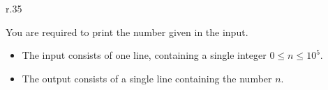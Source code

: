 
\begin{wrapfigure}{r}{.35\textwidth}
	\vspace*{-3mm} %
	\centering
	\vspace*{-10mm} %
\end{wrapfigure}

\newcommand{\maxn}{10^5}

You are required to print the number given in the input.

\begin{Input}
	\begin{itemize}
		\item The input consists of one line, containing a single integer $0\leq n\leq \maxn$.
	\end{itemize}
\end{Input}

\begin{Output}
	\begin{itemize}
		\item The output consists of a single line containing the number $n$.
	\end{itemize}
\end{Output}

